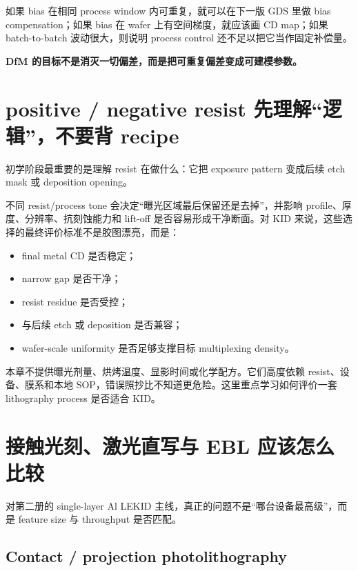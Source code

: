 如果 bias 在相同 process window 内可重复，就可以在下一版 GDS 里做 bias compensation；如果 bias 在 wafer 上有空间梯度，就应该画 CD map；如果 batch-to-batch 波动很大，则说明 process control 还不足以把它当作固定补偿量。

\begin{center}
\textbf{DfM 的目标不是消灭一切偏差，而是把可重复偏差变成可建模参数。}
\end{center}

\section{positive / negative resist 先理解“逻辑”，不要背 recipe}

初学阶段最重要的是理解 resist 在做什么：它把 exposure pattern 变成后续 etch mask 或 deposition opening。

不同 resist/process tone 会决定“曝光区域最后保留还是去掉”，并影响 profile、厚度、分辨率、抗刻蚀能力和 lift-off 是否容易形成干净断面。对 KID 来说，这些选择的最终评价标准不是胶图漂亮，而是：

\begin{itemize}
  \item final metal CD 是否稳定；
  \item narrow gap 是否干净；
  \item resist residue 是否受控；
  \item 与后续 etch 或 deposition 是否兼容；
  \item wafer-scale uniformity 是否足够支撑目标 multiplexing density。
\end{itemize}

\begin{warningbox}
本章不提供曝光剂量、烘烤温度、显影时间或化学配方。它们高度依赖 resist、设备、膜系和本地 SOP，错误照抄比不知道更危险。这里重点学习如何评价一套 lithography process 是否适合 KID。
\end{warningbox}

\section{接触光刻、激光直写与 EBL 应该怎么比较}

对第二册的 single-layer Al LEKID 主线，真正的问题不是“哪台设备最高级”，而是 feature size 与 throughput 是否匹配。

\subsection{Contact / projection photolithography}


